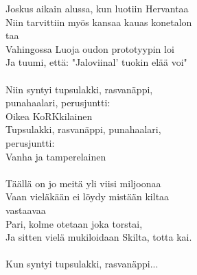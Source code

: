 
Joskus aikain alussa, kun luotiin Hervantaa \\ Niin tarvittiin myös kansaa kauas konetalon \\ taa \\ Vahingossa Luoja oudon prototyypin loi \\ Ja tuumi, että: "Jaloviinal' tuokin elää voi" \\ \hspace{10mm} \\ Niin syntyi tupsulakki, rasvanäppi, \\ punahaalari, perusjuntti: \\ Oikea KoRKkilainen \\ Tupsulakki, rasvanäppi, punahaalari, \\ perusjuntti: \\ Vanha ja tamperelainen \\ \hspace{10mm} \\ Täällä on jo meitä yli viisi miljoonaa \\ Vaan vieläkään ei löydy mistään kiltaa \\ vastaavaa \\ Pari, kolme otetaan joka torstai, \\ Ja sitten vielä mukiloidaan Skilta, totta kai. \\ \hspace{10mm} \\ Kun syntyi tupsulakki, rasvanäppi...